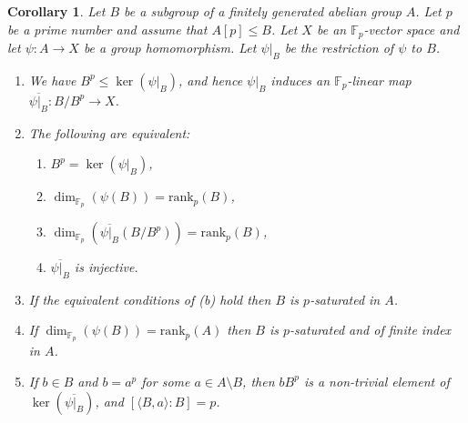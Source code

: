 \documentclass[12pt, a4paper, usenames]{amsart}
\newcommand{\F}{\mathbb{F}}
\theoremstyle{plain}
\newtheorem{corollary}[theorem]{Corollary}
\theoremstyle{remark}
\theoremstyle{definition}
\newcommand{\rank}{\mathrm{rank}}
\begin{document}
\begin{corollary}\label{cor:p-sat}
Let $B$ be a subgroup of a finitely generated abelian group $A$.  
Let $p$ be a prime number and assume that $A[p] \leq B$.
Let $X$ be an $\F_p$-vector space and let $\psi \colon A \to X$ be a group homomorphism. 
Let $\psi \vert_{B}$ be the restriction of $\psi$ to $B$.
\renewcommand{\labelenumii}{(\roman{enumii})}
\begin{enumerate}
    \item 
    We have $B^{p} \leq \ker(\psi \vert_{B})$, and hence $\psi \vert_{B}$
    induces an $\F_{p}$-linear map $\overline{\psi \vert_{B}} \colon B/B^{p} \to X$.
    \item The following are equivalent:
    \begin{enumerate}
        \item $B^{p} = \ker(\psi \vert_{B})$,
        \item $\dim_{\F_p}(\psi(B)) = \rank_{p}(B)$,
        \item $\dim_{\F_p}(\overline{\psi \vert_{B}}(B/B^{p})) = \rank_{p}(B)$,
        \item $\overline{\psi \vert_{B}}$ is injective.
    \end{enumerate}
    \item If the equivalent conditions of \textup{(b)} 
    hold then $B$ is $p$-saturated in $A$.
    \item If $\dim_{\F_p}(\psi(B)) = \rank_{p}(A)$ then $B$ is $p$-saturated and of finite index in $A$.
    \item If $b \in B$ and $b = a^{p}$ for some $a \in A \setminus B$, 
    then $bB^{p}$ is a non-trivial element of $\ker(\overline{\psi \vert_{B}})$, and 
    $[\langle B, a \rangle : B]=p$.
\end{enumerate}    
\end{corollary}
\end{document}
